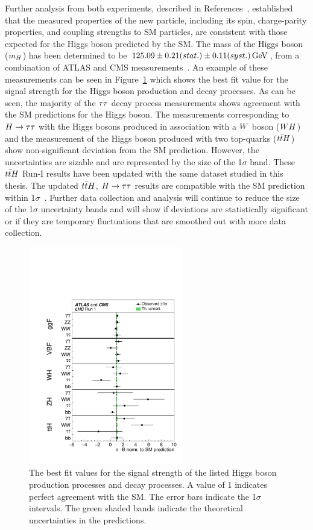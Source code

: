 Further analysis from both experiments, described in References~\cite{Aad:2015gba, Khachatryan:2014jba, 
Chatrchyan:2012jja, Aad:2013xqa, Khachatryan:2014kca,Sirunyan:2017exp},
established that the measured properties of the new particle,
including its spin, charge-parity properties, and coupling strengths to SM particles, 
are consistent with those expected for the Higgs boson predicted by the SM.
The mass of the Higgs boson ($m_{H}$) has been determined to be
$125.09\pm0.21(stat.)\pm0.11(syst.)\,\mathrm{GeV}$, from a combination of
ATLAS and CMS measurements~\cite{Aad:2015zhl}. An example of these measurements
can be seen in Figure~\ref{fig:run_1_comb_mu} which shows the best fit value for the signal
strength for the Higgs boson production and decay processes. As can be seen, the
majority of the $\tau\tau$ decay process measurements shows agreement with the SM predictions for the Higgs
boson. The measurements corresponding to $H\to\tau\tau$ with the Higgs bosons produced in association
with a $W$ boson ($WH$) and the measurement of the Higgs boson produced with
two top-quarks ($t\bar{t}H$) show non-significant deviation from the SM prediction. However, 
the uncertainties are sizable and are represented by the size of the 1$\sigma$ band. 
These $t\bar{t}H$ Run-I results have been updated with the same dataset studied in this thesis.
The updated $t\bar{t}H$, $H\to\tau\tau$ results are compatible with the SM prediction within 1$\sigma$~\cite{Sirunyan:2018hoz}.
Further data collection and analysis
will continue to reduce the size of the 1$\sigma$ uncertainty bands and will show if 
deviations are statistically significant or if they are 
temporary fluctuations that are smoothed out with more data collection.

\begin{figure}[htbp]
\centering
     \includegraphics[width=0.6\textwidth]{introduction/plots/run_1_comb_mu.pdf}
     \caption{
The best fit values for the signal strength of the listed Higgs boson production
processes and decay processes. A value of 1 indicates perfect agreement with the SM.
The error bars indicate the 1$\sigma$ intervals. The green shaded bands indicate the
theoretical uncertainties in the predictions.
     }
     \label{fig:run_1_comb_mu}
\end{figure}

